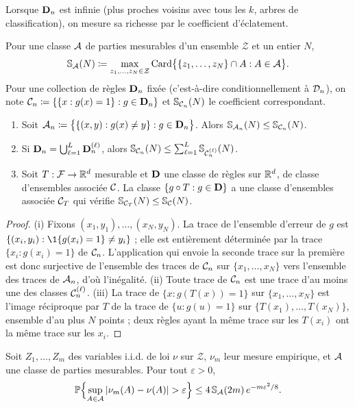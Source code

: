 Lorsque $\mathbf{D}_n$ est infinie (plus proches voisins avec tous les $k$, arbres de classification), on mesure sa richesse par le coefficient d'éclatement.

\begin{definition}\label{def-shatter}
Pour une classe $\mathcal{A}$ de parties mesurables d'un ensemble $\mathcal{Z}$ et un entier $N$,
\[
  \mathbb{S}_{\mathcal{A}}(N) \coloneqq \max_{z_1,\dots,z_N\in\mathcal{Z}}\operatorname{Card}\bigl\{\{z_1,\dots,z_N\}\cap A : A\in\mathcal{A}\bigr\}.
\]
Pour une collection de règles $\mathbf{D}_n$ fixée (c'est-à-dire conditionnellement à $\mathcal{D}_n$), on note $\mathcal{C}_n\coloneqq\{\{x:g(x)=1\}:g\in\mathbf{D}_n\}$ et $\mathbb{S}_{\mathcal{C}_n}(N)$ le coefficient correspondant.
\end{definition}

\begin{lemme}\label{lem-shatter-proprietes}
\begin{enumerate}[label=(\roman*)]
  \item Soit $\mathcal{A}_n\coloneqq\bigl\{\{(x,y):g(x)\neq y\}:g\in\mathbf{D}_n\bigr\}$. Alors $\mathbb{S}_{\mathcal{A}_n}(N)\le\mathbb{S}_{\mathcal{C}_n}(N)$.
  \item Si $\mathbf{D}_n=\bigcup_{\ell=1}^L\mathbf{D}_n^{(\ell)}$, alors $\mathbb{S}_{\mathcal{C}_n}(N)\le\sum_{\ell=1}^L\mathbb{S}_{\mathcal{C}_n^{(\ell)}}(N)$.
  \item Soit $T:\mathcal{F}\to\mathbb{R}^d$ mesurable et $\mathbf{D}$ une classe de règles sur $\mathbb{R}^d$, de classe d'ensembles associée $\mathcal{C}$. La classe $\{g\circ T:g\in\mathbf{D}\}$ a une classe d'ensembles associée $\mathcal{C}_T$ qui vérifie $\mathbb{S}_{\mathcal{C}_T}(N)\le\mathbb{S}_{\mathcal{C}}(N)$.
\end{enumerate}
\end{lemme}

\begin{proof}
(i) Fixons $(x_1,y_1),\dots,(x_N,y_N)$. La trace de l'ensemble d'erreur de $g$ est $\{(x_i,y_i):\1\{g(x_i)=1\}\neq y_i\}$ ; elle est entièrement déterminée par la trace $\{x_i:g(x_i)=1\}$ de $\mathcal{C}_n$. L'application qui envoie la seconde trace sur la première est donc surjective de l'ensemble des traces de $\mathcal{C}_n$ sur $\{x_1,\dots,x_N\}$ vers l'ensemble des traces de $\mathcal{A}_n$, d'où l'inégalité.
(ii) Toute trace de $\mathcal{C}_n$ est une trace d'au moins une des classes $\mathcal{C}_n^{(\ell)}$.
(iii) La trace de $\{x:g(T(x))=1\}$ sur $\{x_1,\dots,x_N\}$ est l'image réciproque par $T$ de la trace de $\{u:g(u)=1\}$ sur $\{T(x_1),\dots,T(x_N)\}$, ensemble d'au plus $N$ points ; deux règles ayant la même trace sur les $T(x_i)$ ont la même trace sur les $x_i$.
\end{proof}

\begin{theoreme}\label{thm-vc}
Soit $Z_1,\dots,Z_m$ des variables i.i.d. de loi $\nu$ sur $\mathcal{Z}$, $\nu_m$ leur mesure empirique, et $\mathcal{A}$ une classe de parties mesurables. Pour tout $\varepsilon>0$,
\[
  \PP\Bigl\{\sup_{A\in\cA}|\nu_m(A)-\nu(A)|>\varepsilon\Bigr\}\le 4\,\Sh_{\cA}(2m)\,e^{-m\varepsilon^2/8}.
\]
\end{theoreme}

